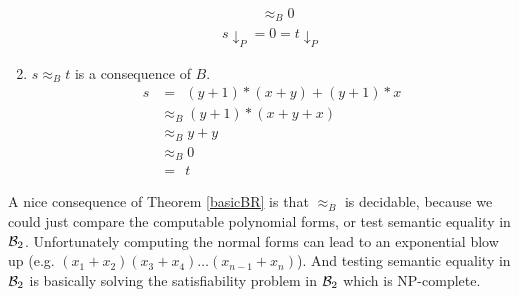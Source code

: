 \begin{enumerate}
\begin{align*}
		      	  & \approx_B 0                   
		      \end{align*}
		      \begin{align*}
		      	s{\downarrow_P}=0=t{\downarrow_P} 
		      \end{align*}
		\item $s\approx_B t$ is a consequence of $B$.
		      \begin{align*}
		      	s & =\ \ (y+1)*(x+y)+(y+1)*x \\
		      	  & \approx_B (y+1)*(x+y+x)  \\
		      	  & \approx_B y+y            \\
		      	  & \approx_B 0              \\
		      	  & =\ \ t                   
		      \end{align*}
	\end{enumerate}
	A nice consequence of Theorem \ref{basicBR} is that $\approx_B$ is decidable, because we could just compare the computable polynomial forms, or test semantic equality in ${\mathcal{B}_2}$.
	Unfortunately computing the normal forms can lead to an exponential blow up (e.g. $(x_1+x_2)(x_3+x_4)\dots(x_{n-1}+x_n)$). And testing semantic equality in ${\mathcal{B}_2}$ is basically solving the satisfiability problem in ${\mathcal{B}_2}$ which is NP-complete.
